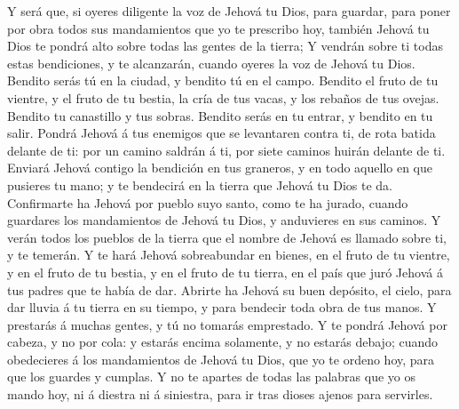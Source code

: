  Y será que, si oyeres diligente la voz de Jehová tu Dios,
para guardar, para poner por obra todos sus mandamientos que yo te
prescribo hoy, también Jehová tu Dios te pondrá alto sobre todas las
gentes de la tierra;  Y vendrán sobre ti todas estas
bendiciones, y te alcanzarán, cuando oyeres la voz de Jehová tu Dios.
 Bendito serás tú en la ciudad, y bendito tú en el campo.
 Bendito el fruto de tu vientre, y el fruto de tu bestia, la
cría de tus vacas, y los rebaños de tus ovejas.  Bendito tu
canastillo y tus sobras.  Bendito serás en tu entrar, y
bendito en tu salir.  Pondrá Jehová á tus enemigos que se
levantaren contra ti, de rota batida delante de ti: por un camino
saldrán á ti, por siete caminos huirán delante de ti. 
Enviará Jehová contigo la bendición en tus graneros, y en todo aquello
en que pusieres tu mano; y te bendecirá en la tierra que Jehová tu Dios
te da.  Confirmarte ha Jehová por pueblo suyo santo, como te
ha jurado, cuando guardares los mandamientos de Jehová tu Dios, y
anduvieres en sus caminos.  Y verán todos los pueblos de la
tierra que el nombre de Jehová es llamado sobre ti, y te temerán.
 Y te hará Jehová sobreabundar en bienes, en el fruto de tu
vientre, y en el fruto de tu bestia, y en el fruto de tu tierra, en el
país que juró Jehová á tus padres que te había de dar. 
Abrirte ha Jehová su buen depósito, el cielo, para dar lluvia á tu
tierra en su tiempo, y para bendecir toda obra de tus manos. Y prestarás
á muchas gentes, y tú no tomarás emprestado.  Y te pondrá
Jehová por cabeza, y no por cola: y estarás encima solamente, y no
estarás debajo; cuando obedecieres á los mandamientos de Jehová tu Dios,
que yo te ordeno hoy, para que los guardes y cumplas.  Y no
te apartes de todas las palabras que yo os mando hoy, ni á diestra ni á
siniestra, para ir tras dioses ajenos para servirles.

